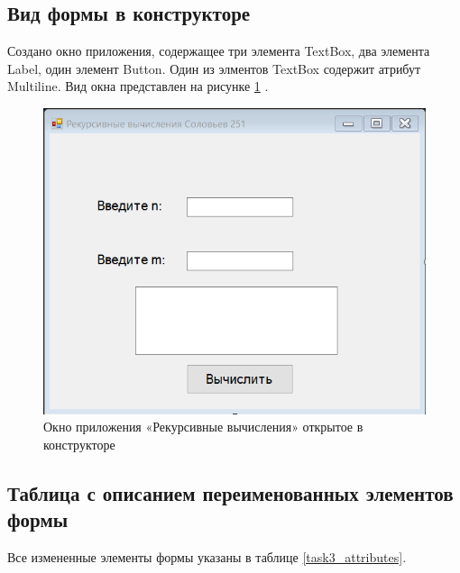 \subsection{Вид формы в конструкторе}

Создано окно приложения, содержащее три элемента TextBox, два элемента
Label, один элемент Button. Один из элментов TextBox содержит атрибут Multiline. Вид окна представлен на рисунке \ref{task3_form} \cite{комракова2022приложение}.
\begin{figure}[H]
    \centering
    \includegraphics[width=0.8\linewidth]{lections/img/task3_form.png}
    \caption{Окно приложения «Рекурсивные вычисления» открытое в конструкторе}
    \label{task3_form}
\end{figure}

\subsection{Таблица с описанием переименованных элементов формы}
Все измененные элементы формы указаны в таблице \ref{task3_attributes}.


